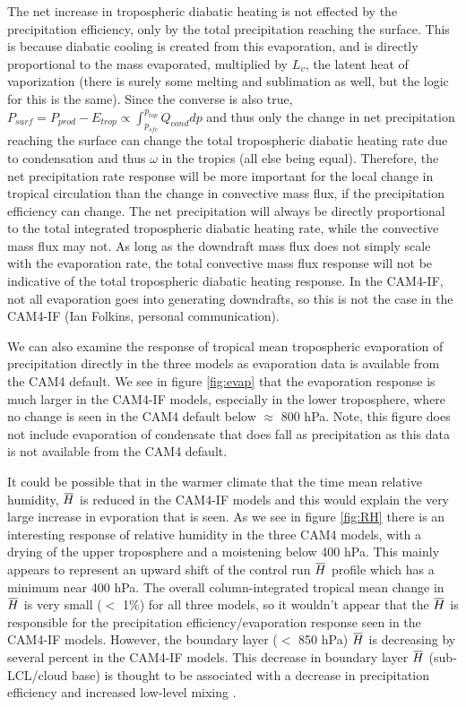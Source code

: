 \documentclass[letterpaper,12pt,titlepage,oneside,final]{book}
\newcommand{\overbar}[1]{\mkern 1.5mu\overline{\mkern-1.5mu#1\mkern-1.5mu}\mkern 1.5mu}
\begin{document}
The net increase in tropospheric diabatic heating is not effected by the precipitation efficiency, only by the total precipitation reaching the surface. This is because diabatic cooling is created from this evaporation, and is directly proportional to the mass evaporated, multiplied by $L_{v}$, the latent heat of vaporization (there is surely some melting and sublimation as well, but the logic for this is the same). Since the converse is also true, $P_{surf}=P_{prod}-E_{trop} \propto \int_{p_{sfc}}^{p_{top}}Q_{cond}dp$ and thus only the change in net precipitation reaching the surface can change the total tropospheric diabatic heating rate due to condensation and thus $\omega$ in the tropics (all else being equal). Therefore, the net precipitation rate response will be more important for the local change in tropical circulation than the change in convective mass flux, if the precipitation efficiency can change. The net precipitation will always be directly proportional to the total integrated tropospheric diabatic heating rate, while the convective mass flux may not. As long as the downdraft mass flux does not simply scale with the evaporation rate, the total convective mass flux response will not be indicative of the total tropospheric diabatic heating response. In the CAM4-IF, not all evaporation goes into generating downdrafts, so this is not the case in the CAM4-IF (Ian Folkins, personal communication).

We can also examine the response of tropical mean tropospheric evaporation of precipitation directly in the three models as evaporation data is available from the CAM4 default. We see in figure \ref{fig:evap} that the evaporation response is much larger in the CAM4-IF models, especially in the lower troposphere, where no change is seen in the CAM4 default below $\approx$ 800 hPa. Note, this figure does not include evaporation of condensate that does fall as precipitation as this data is not available from the CAM4 default. 

It could be possible that in the warmer climate that the time mean relative humidity, $\overbar{H}$ is reduced in the CAM4-IF models and this would explain the very large increase in evporation that is seen. As we see in figure \ref{fig:RH} there is an interesting response of relative humidity in the three CAM4 models, with a drying of the upper troposphere and a moistening below 400 hPa. This mainly appears to represent an upward shift of the control run $\overbar{H}$  profile which has a minimum near 400 hPa. The overall column-integrated tropical mean change in $\overbar{H}$ is very small ($<$ 1\%) for all three models, so it wouldn't appear that the $\overbar{H}$  is responsible for the precipitation efficiency/evaporation response seen in the CAM4-IF models. However, the boundary layer ($<$ 850 hPa) $\overbar{H}$  is decreasing by several percent in the CAM4-IF models. This decrease in boundary layer $\overbar{H}$ (sub-LCL/cloud base) is thought to be associated with a decrease in precipitation efficiency \citep{market_precipitation_2003,sherwood_spread_2014} and increased low-level mixing \citep{sherwood_spread_2014}. 
\end{document}
